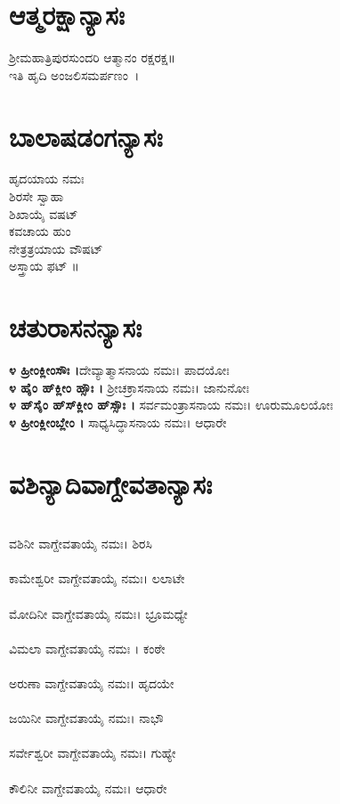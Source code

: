 \section{ಆತ್ಮರಕ್ಷಾನ್ಯಾಸಃ}
 ಶ್ರೀಮಹಾತ್ರಿಪುರಸುಂದರಿ ಆತ್ಮಾನಂ ರಕ್ಷರಕ್ಷ॥\\ಇತಿ ಹೃದಿ ಅಂಜಲಿಸಮರ್ಪಣಂ~।
\section{ಬಾಲಾಷಡಂಗನ್ಯಾಸಃ}
 ಹೃದಯಾಯ ನಮಃ\\
 ಶಿರಸೇ ಸ್ವಾಹಾ\\
ಶಿಖಾಯೈ ವಷಟ್\\
 ಕವಚಾಯ ಹುಂ\\
ನೇತ್ರತ್ರಯಾಯ ವೌಷಟ್\\
 ಅಸ್ತ್ರಾಯ ಫಟ್ ॥
\section{ಚತುರಾಸನನ್ಯಾಸಃ}
{\bfseries ೪ ಹ್ರೀಂಕ್ಲೀಂಸೌಃ ।}ದೇವ್ಯಾತ್ಮಾಸನಾಯ ನಮಃ। ಪಾದಯೋಃ\\
{\bfseries ೪ ಹೈಂ ಹ್‌ಕ್ಲೀಂ ಹ್ಸೌಃ ।} ಶ್ರೀಚಕ್ರಾಸನಾಯ ನಮಃ। ಜಾನುನೋಃ\\
{\bfseries ೪ ಹ್‌ಸೈಂ ಹ್‌ಸ್‌ಕ್ಲೀಂ ಹ್‌ಸ್ಸೌಃ ।} ಸರ್ವಮಂತ್ರಾಸನಾಯ ನಮಃ। ಊರುಮೂಲಯೋಃ\\
{\bfseries ೪ ಹ್ರೀಂಕ್ಲೀಂಬ್ಲೇಂ ।} ಸಾಧ್ಯಸಿದ್ಧಾಸನಾಯ ನಮಃ। ಆಧಾರೇ
\section{ವಶಿನ್ಯಾದಿವಾಗ್ದೇವತಾನ್ಯಾಸಃ}
\\ ವಶಿನೀ ವಾಗ್ದೇವತಾಯೈ ನಮಃ। ಶಿರಸಿ\\
\\ ಕಾಮೇಶ್ವರೀ ವಾಗ್ದೇವತಾಯೈ ನಮಃ। ಲಲಾಟೇ\\
\\ ಮೋದಿನೀ ವಾಗ್ದೇವತಾಯೈ ನಮಃ। ಭ್ರೂಮಧ್ಯೇ\\
\\ ವಿಮಲಾ ವಾಗ್ದೇವತಾಯೈ ನಮಃ । ಕಂಠೇ\\
\\ ಅರುಣಾ ವಾಗ್ದೇವತಾಯೈ ನಮಃ। ಹೃದಯೇ\\
\\ ಜಯಿನೀ ವಾಗ್ದೇವತಾಯೈ ನಮಃ। ನಾಭೌ\\
\\ ಸರ್ವೇಶ್ವರೀ ವಾಗ್ದೇವತಾಯೈ ನಮಃ। ಗುಹ್ಯೇ\\
\\ ಕೌಲಿನೀ ವಾಗ್ದೇವತಾಯೈ ನಮಃ। ಆಧಾರೇ
